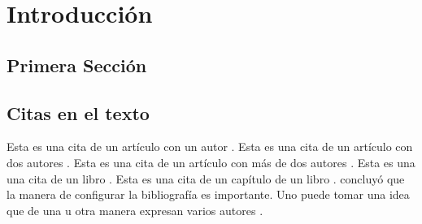 \chapter{Introducción}
\lipsum[1-1]

\section{Primera Sección}
\lipsum[2-3]

\section{Citas en el texto}

Esta es una cita de un artículo con un autor \citep{henderson1999}.
Esta es una cita de un artículo con dos autores \citep{alvarado2005}.
Esta es una cita de un artículo con más de dos autores \citep{schwarz2017}. 
Esta es una una cita de un libro \citep{henderson2002}.
Esta es una cita de un capítulo de un libro \citep{coppard2013}.
\citet{henderson1999} concluyó que la manera de configurar la bibliografía es importante.
Uno puede tomar una idea que de una u otra manera expresan varios autores \citep{henderson1999,schwarz2017,coppard2013}.